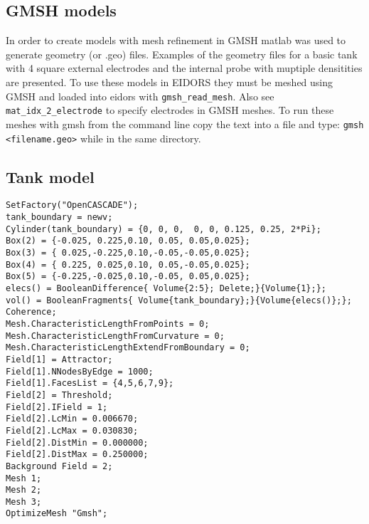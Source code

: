\begin{appendices} 

\chapter{GMSH models} \label{app:geo_stuff}
In order to create models with mesh refinement in GMSH matlab was used
to generate geometry (or .geo) files. Examples of the geometry files for 
a basic tank with 4 square external electrodes and the internal probe 
with muptiple densitities are presented. To use these models in EIDORS 
they must be meshed using GMSH and loaded into eidors 
with \verb!gmsh_read_mesh!. Also see \verb!mat_idx_2_electrode! to specify
electrodes in GMSH meshes. To run these meshes with gmsh from the command line 
copy the text into a file and type: \verb!gmsh <filename.geo>! while in the same
directory.

\section{Tank model}
\begin{Verbatim}[fontsize=\footnotesize]
SetFactory("OpenCASCADE"); 
tank_boundary = newv; 
Cylinder(tank_boundary) = {0, 0, 0,  0, 0, 0.125, 0.25, 2*Pi}; 
Box(2) = {-0.025, 0.225,0.10, 0.05, 0.05,0.025}; 
Box(3) = { 0.025,-0.225,0.10,-0.05,-0.05,0.025}; 
Box(4) = { 0.225, 0.025,0.10, 0.05,-0.05,0.025}; 
Box(5) = {-0.225,-0.025,0.10,-0.05, 0.05,0.025}; 
elecs() = BooleanDifference{ Volume{2:5}; Delete;}{Volume{1};}; 
vol() = BooleanFragments{ Volume{tank_boundary};}{Volume{elecs()};}; 
Coherence; 
Mesh.CharacteristicLengthFromPoints = 0; 
Mesh.CharacteristicLengthFromCurvature = 0; 
Mesh.CharacteristicLengthExtendFromBoundary = 0; 
Field[1] = Attractor; 
Field[1].NNodesByEdge = 1000; 
Field[1].FacesList = {4,5,6,7,9}; 
Field[2] = Threshold; 
Field[2].IField = 1; 
Field[2].LcMin = 0.006670; 
Field[2].LcMax = 0.030830; 
Field[2].DistMin = 0.000000; 
Field[2].DistMax = 0.250000; 
Background Field = 2; 
Mesh 1; 
Mesh 2; 
Mesh 3; 
OptimizeMesh "Gmsh"; 
\end{Verbatim}


\end{appendices}
